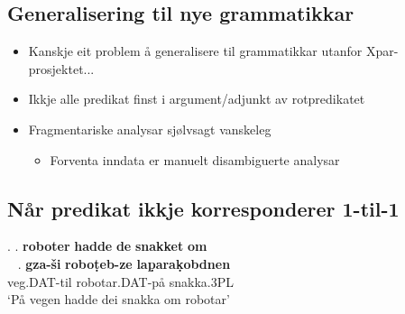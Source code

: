 \documentclass[xcolor=x11names,compress,bigger]{beamer}
\renewcommand{\(}{\begin{columns}}
\renewcommand{\)}{\end{columns}}
\newcommand{\<}[1]{\begin{column}{#1}}
\renewcommand{\>}{\end{column}}
\begin{document}
\subsection{Generalisering til nye grammatikkar}
\begin{frame}
  \begin{itemize}
  \item Kanskje eit problem å generalisere til grammatikkar utanfor Xpar-prosjektet...
  \item Ikkje alle predikat finst i argument/adjunkt av rotpredikatet
  \item Fragmentariske analysar sjølvsagt vanskeleg
    \begin{itemize}
    \item Forventa inndata er manuelt disambiguerte analysar
    \end{itemize}
  \end{itemize}
\end{frame}


\subsection{Når predikat ikkje korresponderer 1-til-1}
\begin{frame}
    {\footnotesize\setlength{\Exlabelsep}{1.0em} %
    \alignSubExtrue %
    \ex. \a. \textbf{roboter} \textbf{hadde} \textbf{de} \textbf{snakket} \textbf{om}\\~
    \bg. \textbf{gza-\v{s}i} \textbf{robo\d{t}eb-ze} \textbf{la\d{p}ara\d{k}obdnen} \\
    veg.DAT-til robotar.DAT-på snakka.3PL \\
    `På vegen hadde dei snakka om robotar'

  }
\end{frame}
\end{document}

